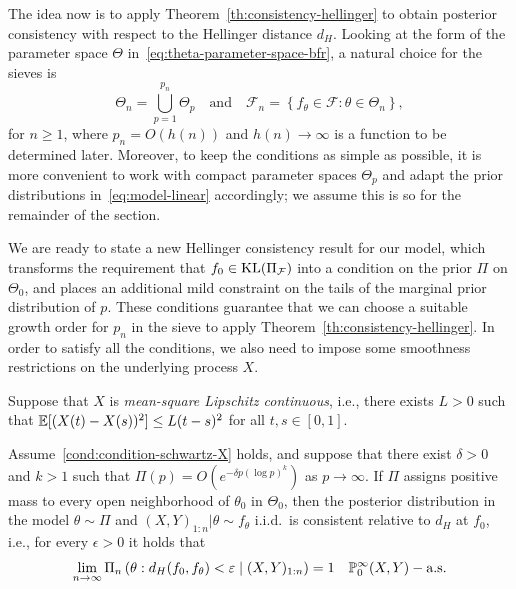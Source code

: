 The idea now is to apply Theorem~\ref{th:consistency-hellinger} to obtain posterior consistency with respect to the Hellinger distance \(d_H\). Looking at the form of the parameter space \(\Theta\) in~\eqref{eq:theta-parameter-space-bfr}, a natural choice for the sieves is 
\[
\Theta_n = \bigcup_{p=1}^{p_n} \Theta_p\quad \text{and}\quad  \mathcal F_n=\left\{f_\theta\in\mathcal F: \theta \in \Theta_n\right\},
\]
for \(n\geq 1\), where \(p_n=O(h(n))\) and \(h(n)\to \infty\) is a function to be determined later. Moreover, to keep the conditions as simple as possible, it is more convenient to work with compact parameter spaces \(\Theta_p\) and adapt the prior distributions in~\eqref{eq:model-linear} accordingly; we assume this is so for the remainder of the section. 

We are ready to state a new Hellinger consistency result for our model, which transforms the requirement that \(f_0\in \operatorname{KL}(\Pi_{\mathcal F})\) into a condition on the prior \(\Pi\) on \(\Theta_0\), and places an additional mild constraint on the tails of the marginal prior distribution of \(p\). These conditions guarantee that we can choose a suitable growth order for \(p_n\) in the sieve to apply Theorem~\ref{th:consistency-hellinger}. In order to satisfy all the conditions, we also need to impose some smoothness restrictions on the underlying process \(X\).

\begin{assumption}\label{cond:condition-schwartz-X}
  Suppose that \(X\) is \textit{mean-square Lipschitz continuous}, i.e., there exists \(L>0\) such that \(\mathbb{E}[(X(t) - X(s))^2] \leq L (t-s)^2\) for all \(t, s \in [0,1]\).
\end{assumption}

\begin{theorem}\label{th:consistency-schwartz-linear}
  Assume~\ref{cond:condition-schwartz-X} holds, and suppose that there exist \(\delta > 0\) and \(k>1\) such that \(\Pi(p)=O(e^{-\delta p (\log p)^k})\) as \(p\to\infty\). If \(\Pi\) assigns positive mass to every open neighborhood of \(\theta_0\) in \(\Theta_0\), then the posterior distribution in the model \(\theta \sim \Pi\) and \((X,Y)_{1:n}|\theta \sim f_\theta\) i.i.d.\ is consistent relative to \(d_H\) at \(f_0\), i.e., for every \(\epsilon>0\) it holds that
  \[
    \lim_{n\to\infty} \Pi_n\left(\theta: d_H(f_0, f_\theta) < \varepsilon \mid (X,Y)_{1:n}\right)=1\quad \mathbb{P}_0^\infty(X,Y)-\text{a.s.}
  \]
\end{theorem}

